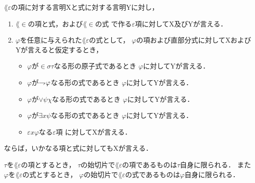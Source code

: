 	\begin{screen}
		\begin{metaaxm}
			$\lang{\varepsilon}$の項に対する言明Xと式に対する言明Yに対し，
			\begin{enumerate}
				\item $\lang{\in}$の項と式，および$\lang{\in}$の式
					で作る$\varepsilon$項に対してX及びYが言える．
				\item $\varphi$を任意に与えられた$\lang{\varepsilon}$の式として，
					$\varphi$の項および直部分式に対してXおよびYが言えると仮定するとき，
					\begin{itemize}
						\item $\varphi$が$\in \sigma \tau$なる形の原子式であるとき
							$\varphi$に対してYが言える．
						\item $\varphi$が$\rightharpoondown\hspace{-0.25em} \varphi$なる形の式であるとき
							$\varphi$に対してYが言える．
						\item $\varphi$が$\vee \psi \chi$なる形の式であるとき
							$\varphi$に対してYが言える．
						\item $\varphi$が$\exists x \psi$なる形の式であるとき
							$\varphi$に対してYが言える．
						\item $\varepsilon x \varphi$なる$\varepsilon$項
							に対してXが言える．
					\end{itemize}
			\end{enumerate}
			ならば，いかなる項と式に対してもXが言える．
		\end{metaaxm}
	\end{screen}
	
	\begin{screen}
		\begin{metathm}
		\label{metathm:initial_segment_L_epsilon}
			$\tau$を$\lang{\varepsilon}$の項とするとき，
			$\tau$の始切片で$\lang{\varepsilon}$の項であるものは$\tau$自身に限られる．
			また$\varphi$を$\lang{\varepsilon}$の式とするとき，
			$\varphi$の始切片で$\lang{\varepsilon}$の式であるものは$\varphi$自身に限られる．
		\end{metathm}
	\end{screen}
	
